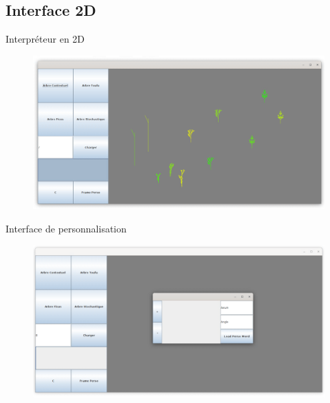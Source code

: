 \documentclass{beamer}
\begin{document}
\subsection{Interface 2D}

\begin{frame}

	\begin{block}{Interpréteur en 2D}
	\begin{figure}[h]
	\includegraphics[scale=0.28]{images/interface2D.png}
	\end{figure}

	\end{block}

\end{frame}
\begin{frame}

	\begin{block}{Interface de personnalisation}
	\begin{figure}[h]
	\includegraphics[scale=0.28]{images/interface2DPerso.png}
	\end{figure}

	\end{block}

\end{frame}
\end{document}
